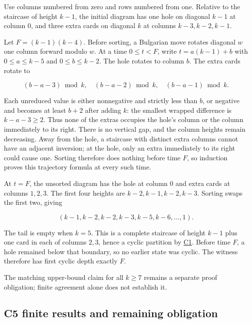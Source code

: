 \documentclass[11pt,a4paper]{article}
\begin{document}
Use columns numbered from zero and rows numbered from one. Relative to the staircase of height \(k-1\), the initial diagram has one hole on diagonal \(k-1\) at column \(0\), and three extra cards on diagonal \(k\) at columns \(k-3,k-2,k-1\).

Let \(F=(k-1)(k-4)\). Before sorting, a Bulgarian move rotates diagonal \(w\) one column forward modulo \(w\). At a time \(0\le t<F\), write \(t=a(k-1)+b\) with \(0\le a\le k-5\) and \(0\le b\le k-2\). The hole rotates to column \(b\). The extra cards rotate to

\[
(b-a-3)\bmod k,\quad(b-a-2)\bmod k,\quad(b-a-1)\bmod k.
\]

Each unreduced value is either nonnegative and strictly less than \(b\), or negative and becomes at least \(b+2\) after adding \(k\): the smallest wrapped difference is \(k-a-3\ge2\). Thus none of the extras occupies the hole's column or the column immediately to its right. There is no vertical gap, and the column heights remain decreasing. Away from the hole, a staircase with distinct extra columns cannot have an adjacent inversion; at the hole, only an extra immediately to its right could cause one. Sorting therefore does nothing before time \(F\), so induction proves this trajectory formula at every such time.

At \(t=F\), the unsorted diagram has the hole at column \(0\) and extra cards at columns \(1,2,3\). The first four heights are \(k-2,k-1,k-2,k-3\). Sorting swaps the first two, giving

\[
(k-1,k-2,k-2,k-3,k-5,k-6,\ldots,1).
\]

The tail is empty when \(k=5\). This is a complete staircase of height \(k-1\) plus one card in each of columns \(2,3\), hence a cyclic partition by \href{https://github.com/mpelteshki/climbing-to-the-frontier/blob/212bba53b1818c08c40b8c4b48f636651eaf6410/cagent/p3/c1/written-proof.md}{C1}. Before time \(F\), a hole remained below that boundary, so no earlier state was cyclic. The witness therefore has first cyclic depth exactly \(F\).

The matching upper-bound claim for all \(k\ge7\) remains a separate proof obligation; finite agreement alone does not establish it.

\subsection{C5 finite results and remaining obligation}\label{c5-finite-results-and-remaining-obligation}
\end{document}
